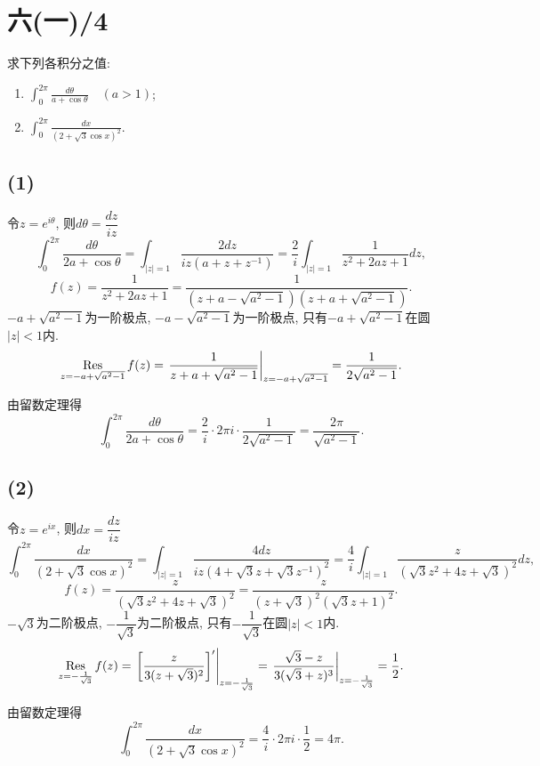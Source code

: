 \documentclass[11pt,a4paper]{article}
\author{刘逸灏 (515370910207)}
\newcommand{\res}[1]{\mathop{\Res}\limits_{#1}}
\begin{document}
\maketitle

\section{六(一)/4}
\begin{problem}
求下列各积分之值:
\begin{enumerate}
  \item $\displaystyle\int_0^{2\pi}\frac{d\theta}{a+\cos\theta}\quad(a>1)$;
  \item $\displaystyle\int_0^{2\pi}\frac{dx}{(2+\sqrt{3}\cos x)^2}$.
\end{enumerate}
\end{problem}
\subsection*{(1)}
令$z=e^{i\theta}$, 则$d\theta=\dfrac{dz}{iz}$
$$\int_0^{2\pi}\frac{d\theta}{2a+\cos\theta}=\int_{|z|=1}\frac{2dz}{iz(a+z+z^{-1})}=\frac{2}{i}\int_{|z|=1}\frac{1}{z^2+2az+1}dz,$$
$$f(z)=\frac{1}{z^2+2az+1}=\frac{1}{(z+a-\sqrt{a^2-1})(z+a+\sqrt{a^2-1})}.$$
$-a+\sqrt{a^2-1}$为一阶极点, $-a-\sqrt{a^2-1}$为一阶极点, 只有$-a+\sqrt{a^2-1}$在圆$|z|<1$内.
$$\res{z=-a+\sqrt{a^2-1}}f(z)=\left.\frac{1}{z+a+\sqrt{a^2-1}}\right|_{z=-a+\sqrt{a^2-1}}=\frac{1}{2\sqrt{a^2-1}}.$$

由留数定理得
$$\int_0^{2\pi}\frac{d\theta}{2a+\cos\theta}=\frac{2}{i}\cdot 2\pi i\cdot \frac{1}{2\sqrt{a^2-1}}=\frac{2\pi}{\sqrt{a^2-1}}.$$

\subsection*{(2)}
令$z=e^{ix}$, 则$dx=\dfrac{dz}{iz}$
$$\int_0^{2\pi}\frac{dx}{(2+\sqrt{3}\cos x)^2}=\int_{|z|=1}\frac{4dz}{iz(4+\sqrt{3}z+\sqrt{3}z^{-1})^2}=\frac{4}{i}\int_{|z|=1}\frac{z}{(\sqrt{3}z^2+4z+\sqrt{3})^2}dz,$$
$$f(z)=\frac{z}{(\sqrt{3}z^2+4z+\sqrt{3})^2}=\frac{z}{(z+\sqrt{3})^2(\sqrt{3}z+1)^2}.$$
$-\sqrt{3}$为二阶极点, $-\dfrac{1}{\sqrt{3}}$为二阶极点, 只有$-\dfrac{1}{\sqrt{3}}$在圆$|z|<1$内.
$$\res{z=-\frac{1}{\sqrt{3}}}f(z)=\left.\left[\frac{z}{3(z+\sqrt{3})^2}\right]'\right|_{z=-\frac{1}{\sqrt{3}}}=\left.\frac{\sqrt{3}-z}{3(\sqrt{3}+z)^3}\right|_{z=-\frac{1}{\sqrt{3}}}=\frac{1}{2}.$$

由留数定理得
$$\int_0^{2\pi}\frac{dx}{(2+\sqrt{3}\cos x)^2}=\frac{4}{i}\cdot 2\pi i\cdot \frac{1}{2}=4\pi.$$
\end{document}
